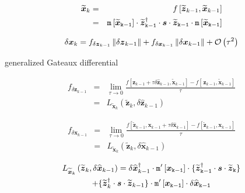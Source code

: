 \documentclass[letterpaper,twocolumn,amsmath,amsfont,amssymb,english,aps,jcp,preprintnumbers,groupaddress,nofootinbib,tightenlines]{revtex4}
\newcommand{\mat}[1]{\boldsymbol{#1}}
\begin{document}
\begin{eqnarray}
\widetilde{\mat{x}}_k &=& f \left[\widetilde{\mat{z}}_{k-1} , \widetilde{\mat{x}}_{k-1} \right] \\ 
&=&
\tt{m} \left[ \widetilde{\mat{x}}_{k-1}\right] \cdot \widetilde{\mat{z}}^\dagger_{k-1}  
\cdot \mat{s} \cdot \widetilde{\mat{z}}_{k-1} \cdot \tt{m}\left[ \widetilde{\mat{x}}_{k-1} \right] 
\nonumber
\end{eqnarray}

\begin{equation}
\delta \mat{x}_k = {f}_{\delta \mat{z}_{k-1}}  \, \lVert \delta \mat{z}_{k-1} \rVert 
                              +  {f}_{\delta \mat{x}_{k-1}}   \, \lVert \delta \mat{x}_{k-1} \rVert 
                                                                                      + {\cal{O}} \left(  \tau^2 \right)
\end{equation}

generalized Gateaux differential

\begin{eqnarray}
f_{\delta \mat{z}_{k-1}} &=& \lim_{\tau \rightarrow 0} \frac{ f [ \mat{z}_{k-1} +\tau  \delta \widehat{\mat{z}}_{k-1}, \widetilde{\mat{x}}_{k-1} ]
-f [\, \mat{z}_{k-1}, \widetilde{\mat{x}}_{k-1} ]  }{\tau} \nonumber  \\[0.1cm] 
&=&{L}_{\widetilde{\mat{x}}_k}\left(\widetilde{\mat{z}}_{k} , \delta \widehat{\mat{z}}_{k-1} \right)  
\end{eqnarray}

\begin{eqnarray}
f_{\delta \mat{x}_{k-1}} &=& \lim_{\tau \rightarrow 0} \frac{ f [ \widetilde{\mat{z}}_{k-1}, \mat{x}_{k-1} + \tau \delta \widehat{\mat{x}}_{k-1} ]
-f [ \widetilde{\mat{z}}_{k-1}, \mat{x}_{k-1} ]  }{\tau} \nonumber  \\[0.1cm] 
&=&{L}_{\widetilde{\mat{x}}_k}\left(\widetilde{\mat{z}}_{k} , \delta \widehat{\mat{x}}_{k-1} \right)  
\end{eqnarray}

\begin{multline}
{L}_{\widetilde{\mat{x}}_k}\left(\widetilde{\mat{z}}_{k} , \delta \widehat{\mat{x}}_{k-1} \right) 
= \delta \widehat{\mat{x}}^\dagger_{k-1} \cdot   \tt{m}'\left[\mat{x}_{k-1} \right] \cdot 
\{\widetilde{\mat{z}}^\dagger_{k-1}  \cdot \mat{s} \cdot \widetilde{\mat{z}}_{k} \}  \\
+ \{ \widetilde{\mat{z}}^\dagger_{k} \cdot \mat{s} \cdot  \widetilde{\mat{z}}_{k-1} \} 
\cdot \tt{m}'\left[\mat{x}_{k-1} \right]  \cdot \delta \widehat{\mat{x}}_{k-1} 
\end{multline}
\end{document}
